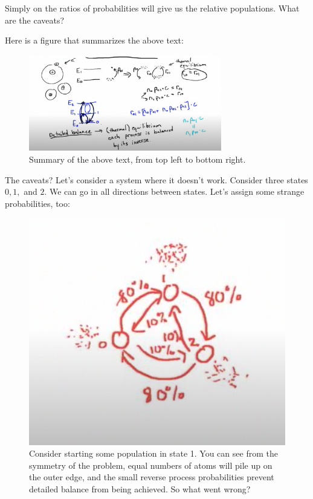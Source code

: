 \documentclass{article}
\begin{document}
Simply on the ratios of probabilities will give us the relative populations. What are the caveats?


Here is a figure that summarizes the above text: 
\begin{figure}
    \centering
    \includegraphics[width=0.75\textwidth]{Screen Shot 2020-10-10 at 7.22.32 PM.png}
    \caption{Summary of the above text, from top left to bottom right. }
    \label{fig:summmmm}
\end{figure}


The caveats? Let's consider a system where it doesn't work. Consider three states $0,1,$ and $2$. We can go in all directions between states. Let's assign some strange probabilities, too:

\begin{figure}
    \centering
    \includegraphics{Screen Shot 2020-10-10 at 7.25.44 PM.png}
    \caption{Consider starting some population in state 1. You can see from the symmetry of the problem, equal numbers of atoms will pile up on the outer edge, and the small reverse process probabilities prevent detailed balance from being achieved. So what went wrong? }
    \label{fig:detbalancefailure}
\end{figure}
\end{document}
